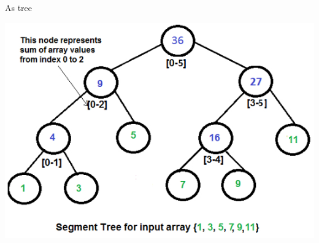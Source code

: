 \documentclass[presentation,9pt]{beamer}
\begin{document}
\begin{frame}[label={sec:org0a301bf}]{As tree}
\begin{center}
\includegraphics[width=.9\linewidth]{./img/segtree.jpg}
\end{center}
\end{frame}
\end{document}
